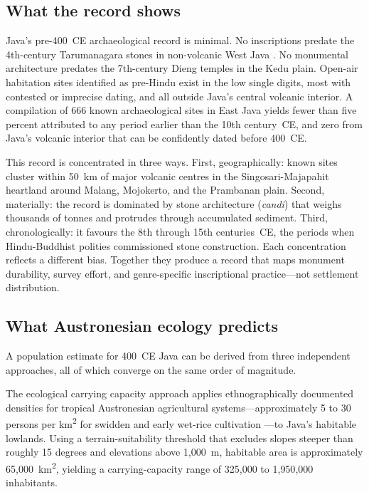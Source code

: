 \documentclass[12pt,a4paper]{article}
\begin{document}
\subsection{What the record shows}

Java's pre-400~CE archaeological record is minimal. No inscriptions predate the 4th-century Tarumanagara stones in non-volcanic West Java \citep{vogel1918,coedes1968}. No monumental architecture predates the 7th-century Dieng temples in the Kedu plain. Open-air habitation sites identified as pre-Hindu exist in the low single digits, most with contested or imprecise dating, and all outside Java's central volcanic interior. A compilation of 666 known archaeological sites in East Java \citep[P1-core]{amien_p1core} yields fewer than five percent attributed to any period earlier than the 10th century~CE, and zero from Java's volcanic interior that can be confidently dated before 400~CE.

This record is concentrated in three ways. First, geographically: known sites cluster within 50~km of major volcanic centres in the Singosari-Majapahit heartland around Malang, Mojokerto, and the Prambanan plain. Second, materially: the record is dominated by stone architecture (\textit{candi}) that weighs thousands of tonnes and protrudes through accumulated sediment. Third, chronologically: it favours the 8th through 15th centuries~CE, the periods when Hindu-Buddhist polities commissioned stone construction. Each concentration reflects a different bias. Together they produce a record that maps monument durability, survey effort, and genre-specific inscriptional practice---not settlement distribution.

\subsection{What Austronesian ecology predicts}

A population estimate for 400~CE Java can be derived from three independent approaches, all of which converge on the same order of magnitude.

The ecological carrying capacity approach applies ethnographically documented densities for tropical Austronesian agricultural systems---approximately 5 to 30 persons per km\textsuperscript{2} for swidden and early wet-rice cultivation \citep{bellwood2017,kirch2000,baylisssmith1980}---to Java's habitable lowlands. Using a terrain-suitability threshold that excludes slopes steeper than roughly 15 degrees and elevations above 1{,}000~m, habitable area is approximately 65{,}000~km\textsuperscript{2}, yielding a carrying-capacity range of 325{,}000 to 1{,}950{,}000 inhabitants.
\end{document}
